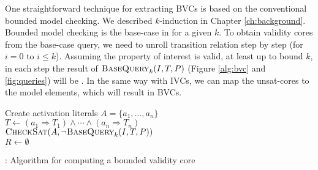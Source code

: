 One straightforward technique for extracting BVCs is based on the conventional bounded model checking.
We described $k$-induction in Chapter \ref{ch:background}. Bounded model checking is the base-case in \label{fig:k-induction} for a given $k$. To obtain validity cores from the base-case query, we need to unroll transition relation step by step (for $i=0$ to $i \leq k$). Assuming the property of interest is valid, at least up to bound $k$, in each step the result of $\textsc{BaseQuery}_k(I, T, P)$ (Figure \ref{alg:bvc} and \ref{fig:queries}) will be \unsat . In the same way with IVCs, we can map the unsat-cores to the model elements, which will result in BVCs.

\begin{algorithm}[t]
  \BlankLine 
   Create activation literals $A = \{a_1, \ldots, a_n\}$ \\
  $T \leftarrow (a_1 \Rightarrow T_1) \land \cdots \land (a_n \Rightarrow T_n)$ \\
  $\textsc{CheckSat}(A, \neg\textsc{BaseQuery}_k(I, T, P))$ \\
  $R \leftarrow \emptyset$ \\
\caption{\bvcalg: Algorithm for computing a bounded validity core}
\label{alg:bvc}
\end{algorithm} 